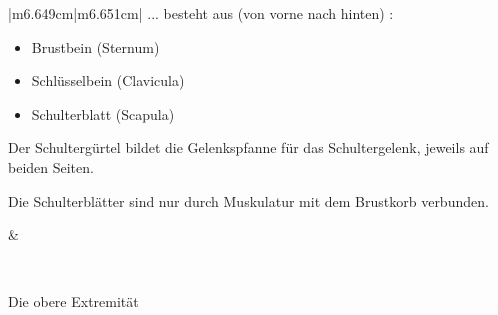 \documentclass{article}
\begin{document}
\begin{center}
\tablehead{}\begin{supertabular}{|m{6.649cm}|m{6.651cm}|}
\hline
... besteht aus (von vorne nach hinten) :

\begin{itemize}
\item {}Brustbein  (Sternum)

\item {}Schl\"usselbein  (Clavicula)

\item {}Schulterblatt  (Scapula)

\end{itemize}
Der Schulterg\"urtel bildet die Gelenkspfanne f\"ur das Schultergelenk,
jeweils auf beiden Seiten.

Die Schulterbl\"atter sind nur durch Muskulatur mit dem Brustkorb
verbunden.

 &
 \par

\\\hline
\end{supertabular}
\end{center}
Die obere Extremit\"at
\end{document}
